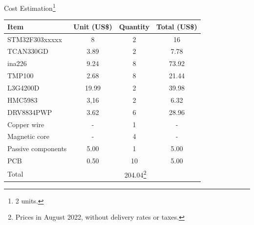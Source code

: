 \documentclass{beamer}
\begin{document}
\begin{frame}{Cost Estimation\footnote{2 units.}}

\begin{table}[!htb]\scriptsize
    \centering
    \label{tab:cost-estimation}
    \begin{tabular}{lccc}
        \toprule[1.5pt]
        \textbf{Item} & \textbf{Unit (US\$)} & \textbf{Quantity} & \textbf{Total (US\$)} \\
        \midrule
        STM32F303xxxxx        & 8     & 2  & 16  \\
        TCAN330GD             & 3.89  & 2  & 7.78 \\
        ina226                & 9.24  & 8  & 73.92\\
        TMP100                & 2.68  & 8  & 21.44\\
        L3G4200D              & 19.99 & 2  & 39.98 \\
        HMC5983               & 3,16  & 2  & 6.32 \\
        DRV8834PWP            & 3.62  & 6  & 28.96 \\
        Copper wire           & -     & 1  & - \\
        Magnetic core         & -     & 4  & - \\
        Passive components    & 5.00  & 1  & 5.00 \\
        PCB                   & 0.50  & 10 & 5.00 \\
        \midrule
        Total          & \multicolumn{3}{c}{204.04\footnote{Prices in August 2022, without delivery rates or taxes.}} \\
        \bottomrule[1.5pt]
    \end{tabular}
\end{table}

\end{frame}

\end{document}

